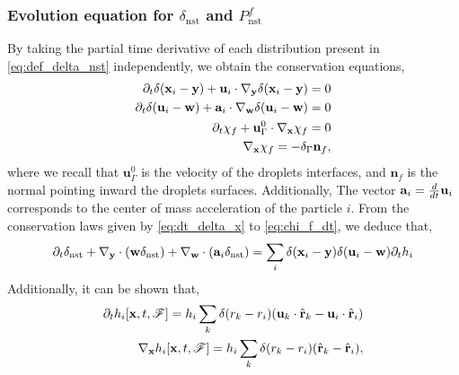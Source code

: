 \subsubsection{Evolution equation for $\delta_\text{nst}$ and  $P_\text{nst}^f$ }

By taking the partial time derivative of each distribution present in \ref{eq:def_delta_nst} independently, we obtain the conservation equations, 
\begin{align}
    \label{eq:dt_delta_x}
    \pddt \delta(\textbf{x}_i  - \textbf{y})
    +\textbf{u}_i  
    \cdot \pddy \delta(\textbf{x}_i  - \textbf{y})
    = 0\\
    \pddt \delta(\textbf{u}_i -\textbf{w})
    +\textbf{a}_i \cdot  \pddw   \delta(\textbf{u}_i  - \textbf{w})
    = 0\\
    \pddt \chi_f 
    + \textbf{u}_\Gamma^0 
    \cdot \pddx \chi_f = 0 \\
    \pddx \chi_f = - \delta_\Gamma \textbf{n}_f,
    \label{eq:chi_f_dt}
\end{align}
where we recall that $\textbf{u}_\Gamma^0$ is the velocity of the droplets interfaces, and $\textbf{n}_f$ is the normal pointing inward the droplets surfaces. 
Additionally, The vector $\textbf{a}_i = \frac{d}{dt} \textbf{u}_i$ corresponds to the center of mass acceleration of the particle $i$. 
From the conservation laws given by \ref{eq:dt_delta_x} to \ref{eq:chi_f_dt}, we deduce that, 
\begin{align}
    \partial_t \delta_\text{nst}
    + {\mathbf{\nabla}_\textbf{y}} \cdot (\textbf{w} \delta_\text{nst})
    + {\mathbf{\nabla}_\textbf{w}} \cdot (\textbf{a}_i  \delta_\text{nst})
    = 
    \sum_i \delta(\textbf{x}_i -\textbf{y}) \delta(\textbf{u}_i - \textbf{w}) \partial_t h_i
\end{align}
Additionally, it can be shown that,
\begin{align}
    \pddt  h_i[\textbf{x},t,\FF]
    = 
    h_i
    \sum_k 
    \delta(r_k - r_i)
    (\textbf{u}_k  \cdot \hat{\textbf{r}}_k - \textbf{u}_i  \cdot \hat{\textbf{r}}_i)\\
    \pddx  h_i[\textbf{x},t,\FF]
    = 
    h_i
    \sum_k 
    \delta(r_k - r_i)
    ( \hat{\textbf{r}}_k -  \hat{\textbf{r}}_i),
    \label{eq:dt_h_i}
\end{align}
